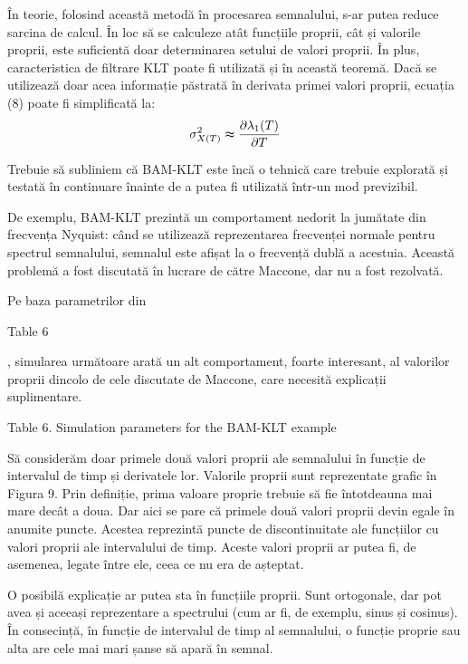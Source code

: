 \documentclass[12pt]{report}
\begin{document}
În teorie, folosind această metodă în procesarea semnalului, s-ar putea reduce sarcina de calcul. În loc să se calculeze atât funcțiile proprii, cât și valorile proprii, este suficientă doar determinarea setului de valori proprii. În plus, caracteristica de filtrare KLT poate fi utilizată și în această teoremă. Dacă se utilizează doar acea informație păstrată în derivata primei valori proprii, ecuația (8) poate fi simplificată la:
\begin{equation}
	\sigma_{X(T)}^2 \thickapprox \pdv{\lambda_1(T)}{T}
	\label{eq:9}
\end{equation}

Trebuie să subliniem că BAM-KLT este încă o tehnică care trebuie explorată și testată în continuare înainte de a putea fi utilizată într-un mod previzibil.

De exemplu, BAM-KLT prezintă un comportament nedorit la jumătate din frecvența \linebreak Nyquist: când se utilizează reprezentarea frecvenței normale pentru spectrul semnalului, semnalul este afișat la o frecvență dublă a acestuia. Această problemă a fost discutată în lucrare de către Maccone, dar nu a fost rezolvată.

Pe baza parametrilor din \begin{normalsize}
	\color{red}Table 6
\end{normalsize}, simularea următoare arată un alt comportament, foarte interesant, al valorilor proprii dincolo de cele discutate de Maccone, care necesită explicații suplimentare.
\begin{center}
	\color{blue}Table 6. Simulation parameters for the BAM-KLT example
\end{center}
Să considerăm doar primele două valori proprii ale semnalului în funcție de intervalul de timp și derivatele lor. Valorile proprii sunt reprezentate grafic în Figura 9. Prin definiție, prima valoare proprie trebuie să fie întotdeauna mai mare decât a doua. Dar aici se pare că primele două valori proprii devin egale în anumite puncte. Acestea reprezintă puncte de discontinuitate ale funcțiilor cu valori proprii ale intervalului de timp. Aceste valori proprii ar putea fi, de asemenea, legate între ele, ceea ce nu era de așteptat.

O posibilă explicație ar putea sta în funcțiile proprii. Sunt ortogonale, dar pot avea și aceeași reprezentare a spectrului (cum ar fi, de exemplu, sinus și cosinus). În consecință, în funcție de intervalul de timp al semnalului, o funcție proprie sau alta are cele mai mari șanse să apară în semnal.
\end{document}
